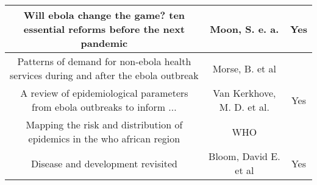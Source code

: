 \documentclass[10pt,a4paper]{article}
\begin{document}
\begin{center}
\begin{tabular}{|c|c|c|}
\hline
{\tiny Will ebola change the game? ten essential reforms before the next pandemic} & Moon, S. e. a. & Yes\\ 
\hline
{\tiny Patterns of demand for non-ebola health services during and after the ebola outbreak} & Morse, B. et al& \\ 
\hline
{\tiny A review of epidemiological parameters from ebola outbreaks to inform ...} & Van Kerkhove, M. D. et al. & Yes \\ 
\hline
{\tiny Mapping the risk and distribution of epidemics in the who african region} & WHO & \\ 
\hline
{\tiny Disease and development revisited} & Bloom, David E. et al & Yes \\ 
\hline
\end{tabular}
\end{center}
\end{document}
